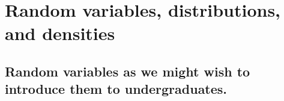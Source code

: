 

\chapter{Random variables, distributions, and densities}

\section{Random variables as we might wish to introduce them to
  undergraduates.}

